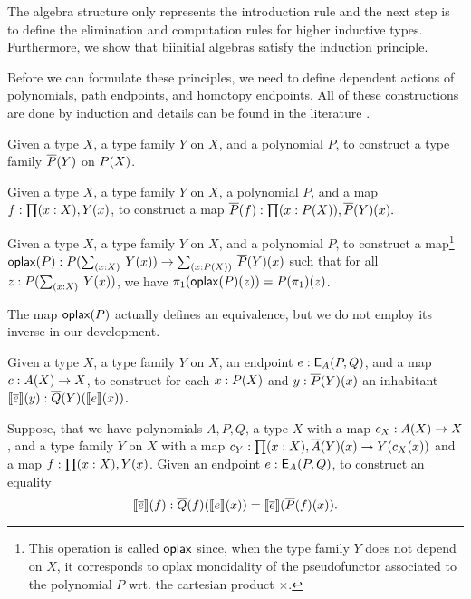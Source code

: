 The algebra structure only represents the introduction rule
and the next step is to define the elimination and computation rules for higher inductive types.
Furthermore, we show that biinitial algebras satisfy the induction principle.

Before we can formulate these principles, we need to define dependent actions of polynomials, path endpoints, and homotopy endpoints.
All of these constructions are done by induction and details can be found in the literature \cite{DBLP:journals/entcs/DybjerM18,hermida1998structural,van2019construction}.

\begin{problem}
\label{prob:poly_dact}
Given a type $X$, a type family $Y$ on $X$, and a polynomial $P$,
to construct a type family $\overline{P}(Y)$ on $P(X)$.
\end{problem}

\begin{problem}
\label{prob:poly_dmap}
Given a type $X$, a type family $Y$ on $X$, a polynomial $P$, and a map $f : \prod (x : X) , Y(x)$,
to construct a map
$
\overline{P}(f) : \prod (x : P(X)) , \overline{P}(Y)(x).
$
\end{problem}

\begin{problem}
\label{prob:poly_pr}
Given a type $X$, a type family $Y$ on $X$, and a polynomial $P$, to construct a map\footnote{This operation is called $\mathsf{oplax}$ since, when the type family $Y$ does not depend on $X$, it corresponds to oplax monoidality of the pseudofunctor associated to the polynomial $P$ wrt. the cartesian product $\times$.}
$
\polyoplax P : \polyAct{P}{\Sum (x : X). Y(x)} \rightarrow \Sum (x : \polyAct{P}{X}). \polyDact{P}{Y}(x)
$
such that for all $z :  \polyAct{P}{\Sum (x : X). Y(x)}$, we have $\pi_1(\mathsf{oplax}(P)(z)) = P(\pi_1)(z)$.
\end{problem}
The map $\mathsf{oplax}(P)$ actually defines an equivalence, but we do not employ its inverse in our development.
\begin{problem}
\label{prob:endpoint_dact}
Given a type $X$, a type family $Y$ on $X$, an endpoint $e : \mathsf{E}_{A}(P,Q)$, and a map $c : A(X) \rightarrow X$,
to construct for each $x : P(X)$ and $y : \overline{P}(Y)(x)$ an inhabitant $\llbracket \overline{e} \rrbracket(y) : \overline{Q}(Y)(\llbracket e \rrbracket(x))$.
\end{problem}

\begin{problem}
\label{prob:endpoint_dact_natural}
Suppose, that we have polynomials $A, P, Q$, a type $X$ with a map $c_X : A(X) \rightarrow X$,
and a type family $Y$ on $X$ with a map $c_Y : \prod (x : X) , \overline{A}(Y)(x) \rightarrow Y(c_X(x))$
and a map $f : \prod (x : X) , Y(x)$.
Given an endpoint $e : \mathsf{E}_{A}(P,Q)$,
to construct an equality
\[
\llbracket \overline{e} \rrbracket(f) : \overline{Q}(f)(\llbracket e \rrbracket(x)) = \llbracket \overline{e} \rrbracket(\overline{P}(f)(x)).
\]
\end{problem}

